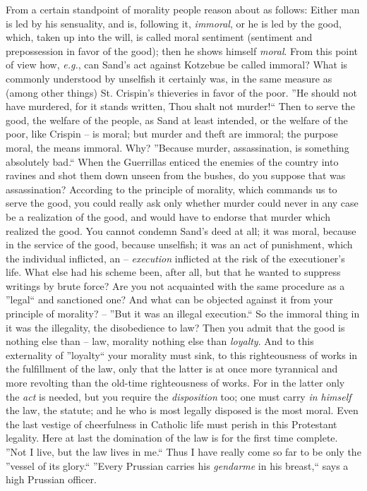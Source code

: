 \documentclass[12pt,a4paper]{book}
\begin{document}
From a certain standpoint of morality people reason about as follows: Either 
man is led by his sensuality, and is, following it, \textit{immoral}, or he is 
led by the good, which, taken up into the will, is called moral sentiment 
(sentiment and prepossession in favor of the good); then he shows himself 
\textit{moral}. From this point of view how, \textit{e.g.}, can Sand's act 
against Kotzebue be called immoral? What is commonly understood by unselfish 
it certainly was, in the same measure as (among other things) St. Crispin's 
thieveries in favor of the poor. ''He should not have murdered, for it stands 
written, Thou shalt not murder!`` Then to serve the good, the welfare of the 
people, as Sand at least intended, or the welfare of the poor, like Crispin -- 
is moral; but murder and theft are immoral; the purpose moral, the means 
immoral. Why? ''Because murder, assassination, is something absolutely 
bad.`` When the Guerrillas enticed the enemies of the country into ravines 
and shot them down unseen from the bushes, do you suppose that was 
assassination? According to the principle of morality, which commands us to 
serve the good, you could really ask only whether murder could never in any 
case be a realization of the good, and would have to endorse that murder which 
realized the good. You cannot condemn Sand's deed at all; it was moral, 
because in the service of the good, because unselfish; it was an act of 
punishment, which the individual inflicted, an -- \textit{execution} inflicted 
at the risk of the executioner's life. What else had his scheme been, after 
all, but that he wanted to suppress writings by brute force? Are you not 
acquainted with the same procedure as a ''legal`` and sanctioned one? And 
what can be objected against it from your principle of morality? -- ''But it 
was an illegal execution.`` So the immoral thing in it was the illegality, 
the disobedience to law? Then you admit that the good is nothing else than -- 
law, morality nothing else than \textit{loyalty}. And to this externality of 
''loyalty`` your morality must sink, to this righteousness of works in the 
fulfillment of the law, only that the latter is at once more tyrannical and 
more revolting than the old-time righteousness of works. For in the latter 
only the \textit{act} is needed, but you require the \textit{disposition} too; 
one must carry \textit{in himself} the law, the statute; and he who is most 
legally disposed is the most moral. Even the last vestige of cheerfulness in 
Catholic life must perish in this Protestant legality. Here at last the 
domination of the law is for the first time complete. ''Not I live, but the 
law lives in me.`` Thus I have really come so far to be only the ''vessel of 
its glory.`` ''Every Prussian carries his \textit{gendarme} in his 
breast,`` says a high Prussian officer.
\end{document}
